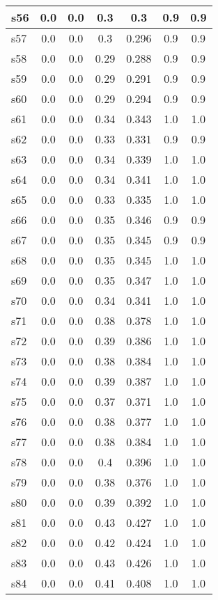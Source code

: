\documentclass{article}
\begin{document}
\begin{tabular}{|l|c|c|c|c|c|c|}
\hline
s56 &0.0 & 0.0 & 0.3 & 0.3 & 0.9 & 0.9\\
\hline
s57 &0.0 & 0.0 & 0.3 & 0.296 & 0.9 & 0.9\\
\hline
s58 &0.0 & 0.0 & 0.29 & 0.288 & 0.9 & 0.9\\
\hline
s59 &0.0 & 0.0 & 0.29 & 0.291 & 0.9 & 0.9\\
\hline
s60 &0.0 & 0.0 & 0.29 & 0.294 & 0.9 & 0.9\\
\hline
s61 &0.0 & 0.0 & 0.34 & 0.343 & 1.0 & 1.0\\
\hline
s62 &0.0 & 0.0 & 0.33 & 0.331 & 0.9 & 0.9\\
\hline
s63 &0.0 & 0.0 & 0.34 & 0.339 & 1.0 & 1.0\\
\hline
s64 &0.0 & 0.0 & 0.34 & 0.341 & 1.0 & 1.0\\
\hline
s65 &0.0 & 0.0 & 0.33 & 0.335 & 1.0 & 1.0\\
\hline
s66 &0.0 & 0.0 & 0.35 & 0.346 & 0.9 & 0.9\\
\hline
s67 &0.0 & 0.0 & 0.35 & 0.345 & 0.9 & 0.9\\
\hline
s68 &0.0 & 0.0 & 0.35 & 0.345 & 1.0 & 1.0\\
\hline
s69 &0.0 & 0.0 & 0.35 & 0.347 & 1.0 & 1.0\\
\hline
s70 &0.0 & 0.0 & 0.34 & 0.341 & 1.0 & 1.0\\
\hline
s71 &0.0 & 0.0 & 0.38 & 0.378 & 1.0 & 1.0\\
\hline
s72 &0.0 & 0.0 & 0.39 & 0.386 & 1.0 & 1.0\\
\hline
s73 &0.0 & 0.0 & 0.38 & 0.384 & 1.0 & 1.0\\
\hline
s74 &0.0 & 0.0 & 0.39 & 0.387 & 1.0 & 1.0\\
\hline
s75 &0.0 & 0.0 & 0.37 & 0.371 & 1.0 & 1.0\\
\hline
s76 &0.0 & 0.0 & 0.38 & 0.377 & 1.0 & 1.0\\
\hline
s77 &0.0 & 0.0 & 0.38 & 0.384 & 1.0 & 1.0\\
\hline
s78 &0.0 & 0.0 & 0.4 & 0.396 & 1.0 & 1.0\\
\hline
s79 &0.0 & 0.0 & 0.38 & 0.376 & 1.0 & 1.0\\
\hline
s80 &0.0 & 0.0 & 0.39 & 0.392 & 1.0 & 1.0\\
\hline
s81 &0.0 & 0.0 & 0.43 & 0.427 & 1.0 & 1.0\\
\hline
s82 &0.0 & 0.0 & 0.42 & 0.424 & 1.0 & 1.0\\
\hline
s83 &0.0 & 0.0 & 0.43 & 0.426 & 1.0 & 1.0\\
\hline
s84 &0.0 & 0.0 & 0.41 & 0.408 & 1.0 & 1.0\\

\end{tabular}
\end{document}

